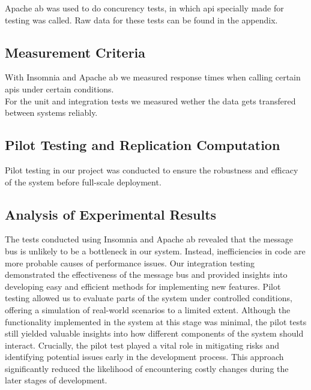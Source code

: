 Apache ab was used to do concurency tests, in which api specially made for testing was called. Raw data for these tests can be found in the appendix.



\subsection{Measurement Criteria}
\label{sec:measurements}

With Insomnia and Apache ab we measured response times when calling certain apis under certain conditions.\\ For the unit and integration tests we measured wether the data gets transfered between systems reliably.

\subsection{Pilot Testing and Replication Computation}
\label{sec:pilot_test}

Pilot testing in our project was conducted to ensure the robustness and efficacy of the system before full-scale deployment.

\subsection{Analysis of Experimental Results}
\label{sec:analysis}
The tests conducted using Insomnia and Apache ab revealed that the message bus is unlikely to be a bottleneck in our system. Instead, inefficiencies in code are more probable causes of performance issues.\newline
Our integration testing demonstrated the effectiveness of the message bus and provided insights into developing easy and efficient methods for implementing new features.\newline
Pilot testing allowed us to evaluate parts of the system under controlled conditions, offering a simulation of real-world scenarios to a limited extent. Although the functionality implemented in the system at this stage was minimal, the pilot tests still yielded valuable insights into how different components of the system should interact.\newline
Crucially, the pilot test played a vital role in mitigating risks and identifying potential issues early in the development process. This approach significantly reduced the likelihood of encountering costly changes during the later stages of development.